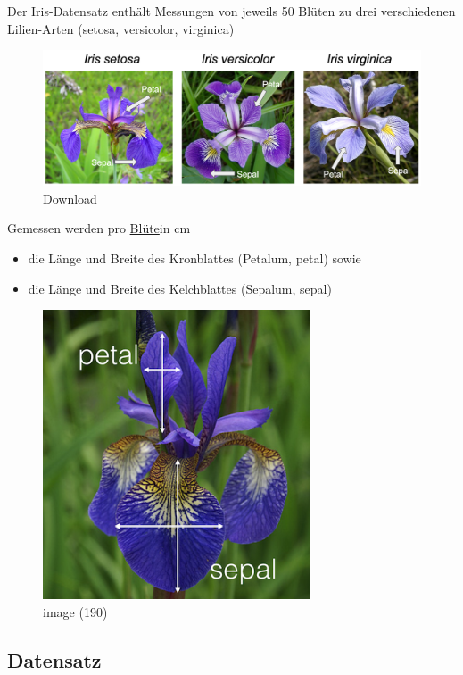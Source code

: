 \documentclass[
  oneside]{book}
\providecommand{\tightlist}{%
  \setlength{\itemsep}{0pt}\setlength{\parskip}{0pt}}
\theoremstyle{definition}
\theoremstyle{definition}
\theoremstyle{definition}
\theoremstyle{definition}
\theoremstyle{remark}
\begin{document}
Der Iris-Datensatz enthält Messungen von jeweils 50 Blüten zu drei verschiedenen Lilien-Arten (setosa, versicolor, virginica)

\begin{figure}
\centering
\includegraphics{assets/daten.assets/Download.png}
\caption{Download}
\end{figure}

Gemessen werden pro \href{https://de.wikipedia.org/wiki/Bl\%C3\%BCte}{Blüte}in cm 

\begin{itemize}
\tightlist
\item
  die Länge und Breite des Kronblattes (Petalum, petal) sowie 
\item
  die Länge und Breite des Kelchblattes (Sepalum, sepal)
\end{itemize}

\begin{figure}
\centering
\includegraphics{assets/daten.assets/image_messung-16426070933692.png}
\caption{image (190)}
\end{figure}

\hypertarget{datensatz-1}{%
\subsection{Datensatz}\label{datensatz-1}}
\end{document}
